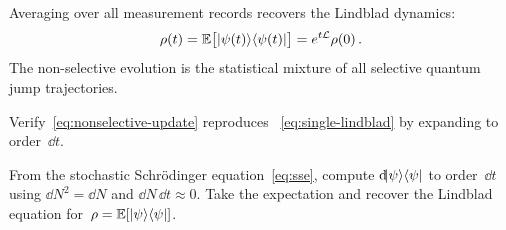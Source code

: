 \begin{keyresult}
  Averaging over all measurement records recovers the Lindblad
  dynamics:
  \begin{equation}\label{eq:ensemble-average}
    \rho(t)
    = \mathbb{E}\bigl[\lvert \psi(t) \rangle\langle \psi(t) \rvert\bigr]
    = e^{t\mathcal{L}}\rho(0)\,.
  \end{equation}
  The non-selective evolution is the statistical mixture of all
  selective quantum jump trajectories.
\end{keyresult}

\begin{exercise}\label{ex:verify-nonselective}
  Verify~\eqref{eq:nonselective-update} reproduces~%
  \eqref{eq:single-lindblad} by expanding to order~$\dd t$.
\end{exercise}

\begin{exercise}\label{ex:sse-average}
  From the stochastic Schr\"odinger equation~\eqref{eq:sse}, compute
  $\mathrm{d}\!\lvert \psi \rangle\langle \psi \rvert$ to order~$\dd t$ using
  $\dd N^2 = \dd N$ and $\dd N\,\dd t \approx 0$.  Take the
  expectation and recover the Lindblad equation
  for~$\rho = \mathbb{E}[\lvert \psi \rangle\langle \psi \rvert]$.
\end{exercise}

